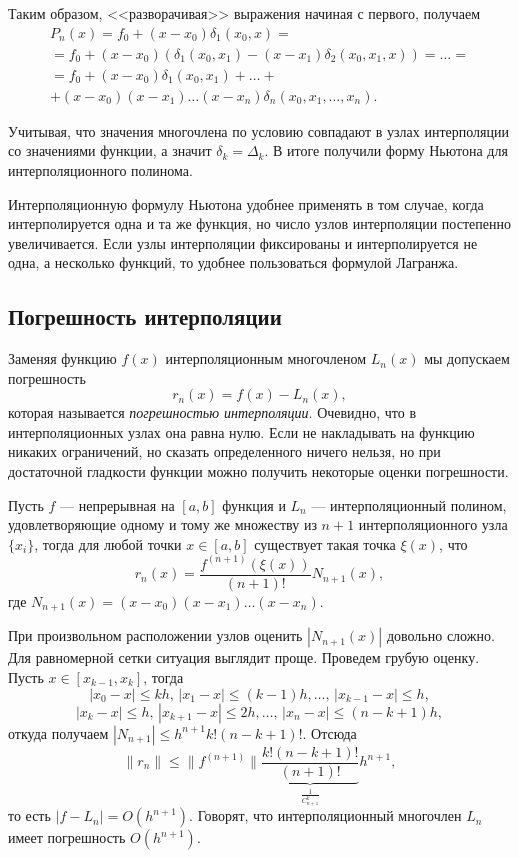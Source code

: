 Таким образом, <<разворачивая>> выражения начиная с первого, получаем
\begin{multline*}
P_{n}(x)=f_{0}+(x-x_{0})\delta_{1}(x_{0},x)=\\
=f_{0}+(x-x_{0})\left(\delta_{1}(x_{0},x_{1})-(x-x_{1})\delta_{2}(x_{0},x_{1},x)\right)=\dots=\\
=f_{0}+(x-x_{0})\delta_{1}(x_{0},x_{1})+\dots+\\
+(x-x_{0})(x-x_{1})\dots(x-x_{n})\delta_{n}(x_{0},x_{1},\dots,x_{n}).
\end{multline*}


Учитывая, что значения многочлена по условию совпадают в узлах интерполяции
со значениями функции, а значит $\delta_{k}=\Delta_{k}$. В итоге
получили форму Ньютона для интерполяционного полинома.

Интерполяционную формулу Ньютона удобнее применять в том случае, когда
интерполируется одна и та же функция, но число узлов интерполяции
постепенно увеличивается. Если узлы интерполяции фиксированы и интерполируется
не одна, а несколько функций, то удобнее пользоваться формулой Лагранжа.


\subsection{Погрешность интерполяции}

Заменяя функцию $f(x)$ интерполяционным многочленом $L_{n}(x)$ мы
допускаем погрешность
\[
r_{n}(x)=f(x)-L_{n}(x),
\]
которая называется \emph{погрешностью интерполяции}. Очевидно, что
в интерполяционных узлах она равна нулю. Если не накладывать на функцию
никаких ограничений, но сказать определенного ничего нельзя, но при
достаточной гладкости функции можно получить некоторые оценки погрешности.

Пусть $f$ --- непрерывная на $[a,b]$ функция и $L_{n}$ --- интерполяционный
полином, удовлетворяющие одному и тому же множеству из $n+1$ интерполяционного
узла $\{x_{i}\}$, тогда для любой точки $x\in[a,b]$ существует такая
точка $\xi(x)$, что
\[
r_{n}(x)=\frac{f^{(n+1)}\left(\xi(x)\right)}{(n+1)!}N_{n+1}(x),
\]
где $N_{n+1}(x)=(x-x_{0})(x-x_{1})\dots(x-x_{n})$.

При произвольном расположении узлов оценить $|N_{n+1}(x)|$ довольно
сложно. Для равномерной сетки ситуация выглядит проще. Проведем грубую
оценку. Пусть $x\in[x_{k-1},x_{k}]$, тогда
\[
|x_{0}-x|\leqslant kh,\,|x_{1}-x|\leqslant(k-1)h,\dots,\,|x_{k-1}-x|\leqslant h,
\]
\[
|x_{k}-x|\leqslant h,\,|x_{k+1}-x|\leqslant2h,\dots,\,|x_{n}-x|\leqslant(n-k+1)h,
\]
откуда получаем $|N_{n+1}|\leqslant h^{n+1}k!(n-k+1)!$. Отсюда
\[
\|r_{n}\|\leqslant\|f^{(n+1)}\|\underset{\frac{1}{C_{n+1}^{k}}}{\underbrace{\frac{k!(n-k+1)!}{(n+1)!}}}h^{n+1},
\]
то есть $|f-L_{n}|=O(h^{n+1})$. Говорят, что интерполяционный многочлен
$L_{n}$ имеет погрешность $O(h^{n+1})$.

